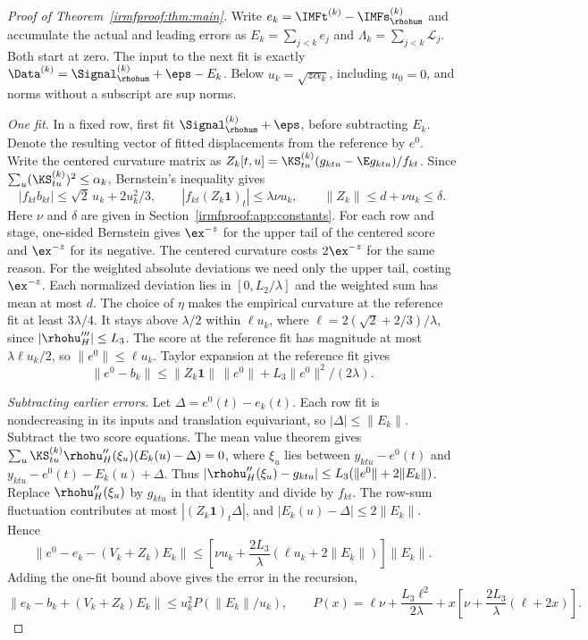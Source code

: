 \begin{proof}[Proof of Theorem~\ref{irmfproof:thm:main}]
Write \(e_k=\IMFt^{(k)}-\IMFs_{\rhohum}^{(k)}\) and accumulate the actual
and leading errors as \(E_k=\sum_{j<k}e_j\) and
\(\Lambda_k=\sum_{j<k}\mathcal L_j\). Both start at zero. The input to the
next fit is exactly \(\Data^{(k)}=\Signal_{\rhohum}^{(k)}+\eps-E_k\).
Below \(u_k=\sqrt{z\alpha_k}\), including \(u_0=0\), and norms without a
subscript are sup norms.

\emph{One fit.}
In a fixed row, first fit \(\Signal_{\rhohum}^{(k)}+\eps\), before subtracting
\(E_k\). Denote the resulting vector of fitted displacements from the reference
by \(e^0\). Write the centered curvature matrix as
\(Z_k[t,u]=\KS_{tu}^{(k)}(g_{ktu}-\E g_{ktu})/f_{kt}\).
Since \(\sum_u(\KS_{tu}^{(k)})^2\le\alpha_k\), Bernstein's inequality gives
\[
 |f_{kt}b_{kt}|\le\sqrt2\,u_k+2u_k^2/3,\qquad
 |f_{kt}(Z_k\mathbf1)_t|\le\lambda\nu u_k,\qquad
 \|Z_k\|\le d+\nu u_k\le\delta .
\]
Here \(\nu\) and \(\delta\) are given in Section~\ref{irmfproof:app:constants}.
For each row and stage, one-sided Bernstein gives \(\ex^{-z}\) for the
upper tail of the centered score and \(\ex^{-z}\) for its negative.
The centered curvature costs \(2\ex^{-z}\) for the same reason.
For the weighted absolute deviations we need only the upper tail, costing
\(\ex^{-z}\). Each normalized deviation lies in \([0,L_2/\lambda]\)
and the weighted sum has mean at most \(d\).
The choice of \(\eta\) makes the empirical
curvature at the reference fit at least \(3\lambda/4\). It stays above
\(\lambda/2\) within \(\ell u_k\), where
\(\ell=2(\sqrt2+2/3)/\lambda\), since \(|\rhohu_H'''|\le L_3\).
The score at the reference fit has magnitude at most \(\lambda\ell u_k/2\),
so \(\|e^0\|\le\ell u_k\). Taylor expansion at the reference fit gives
\[
 \|e^0-b_k\|\le\|Z_k\mathbf1\|\,\|e^0\|
                  +L_3\|e^0\|^2/(2\lambda).
\]

\emph{Subtracting earlier errors.}
Let \(\Delta=e^0(t)-e_k(t)\). Each row fit is nondecreasing in its inputs
and translation equivariant, so \(|\Delta|\le\|E_k\|\).
Subtract the two score equations. The mean value theorem gives
\(\sum_u\KS_{tu}^{(k)}\rhohu_H''(\xi_u)(E_k(u)-\Delta)=0\), where \(\xi_u\)
lies between \(y_{ktu}-e^0(t)\) and \(y_{ktu}-e^0(t)-E_k(u)+\Delta\).
Thus \(|\rhohu_H''(\xi_u)-g_{ktu}|\le L_3(\|e^0\|+2\|E_k\|)\).
Replace \(\rhohu_H''(\xi_u)\) by \(g_{ktu}\) in that identity and divide
by \(f_{kt}\). The row-sum fluctuation contributes at most
\(|(Z_k\mathbf1)_t\Delta|\), and \(|E_k(u)-\Delta|\le2\|E_k\|\). Hence
\[
 \|e^0-e_k-(V_k+Z_k)E_k\|
 \le \left[\nu u_k+\frac{2L_3}{\lambda}(\ell u_k+2\|E_k\|)\right]\|E_k\| .
\]
Adding the one-fit bound above gives the error in the recursion,
\begin{equation}\label{irmfproof:eq:recursion}
 \|e_k-b_k+(V_k+Z_k)E_k\|
 \le u_k^2 P(\|E_k\|/u_k),
 \qquad
 P(x)=\ell\nu+\frac{L_3\ell^2}{2\lambda}
             +x\left[\nu+\frac{2L_3}{\lambda}(\ell+2x)\right].
\end{equation}


\end{proof}
